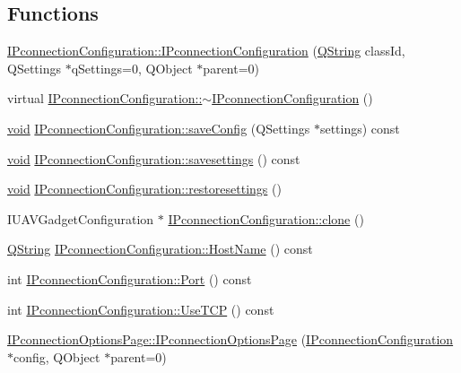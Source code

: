 \subsection*{\-Functions}
\begin{DoxyCompactItemize}
\item 
\hyperlink{group___i_p_conn_plugin_ga0ace87181ef54adf63c246bcfa013840}{\-I\-Pconnection\-Configuration\-::\-I\-Pconnection\-Configuration} (\hyperlink{group___u_a_v_objects_plugin_gab9d252f49c333c94a72f97ce3105a32d}{\-Q\-String} class\-Id, \-Q\-Settings $\ast$q\-Settings=0, \-Q\-Object $\ast$parent=0)
\item 
virtual \hyperlink{group___i_p_conn_plugin_ga9c8548dfb0fd37208686bb5d037dfce4}{\-I\-Pconnection\-Configuration\-::$\sim$\-I\-Pconnection\-Configuration} ()
\item 
\hyperlink{group___u_a_v_objects_plugin_ga444cf2ff3f0ecbe028adce838d373f5c}{void} \hyperlink{group___i_p_conn_plugin_ga65bf62eee71070aef5ce1f9fe1f24322}{\-I\-Pconnection\-Configuration\-::save\-Config} (\-Q\-Settings $\ast$settings) const 
\item 
\hyperlink{group___u_a_v_objects_plugin_ga444cf2ff3f0ecbe028adce838d373f5c}{void} \hyperlink{group___i_p_conn_plugin_ga6e5d554b42d69fd06e4817ec4bece987}{\-I\-Pconnection\-Configuration\-::savesettings} () const 
\item 
\hyperlink{group___u_a_v_objects_plugin_ga444cf2ff3f0ecbe028adce838d373f5c}{void} \hyperlink{group___i_p_conn_plugin_gabd3e5ffc6975c4ef5389faaf21fb55c0}{\-I\-Pconnection\-Configuration\-::restoresettings} ()
\item 
\-I\-U\-A\-V\-Gadget\-Configuration $\ast$ \hyperlink{group___i_p_conn_plugin_gaf970300a500acc18095f6d50a3926529}{\-I\-Pconnection\-Configuration\-::clone} ()
\item 
\hyperlink{group___u_a_v_objects_plugin_gab9d252f49c333c94a72f97ce3105a32d}{\-Q\-String} \hyperlink{group___i_p_conn_plugin_gad855d70f2d3eee8910ee94c261e9f3cb}{\-I\-Pconnection\-Configuration\-::\-Host\-Name} () const 
\item 
int \hyperlink{group___i_p_conn_plugin_gaaa57ca41a00de517e859afa3c339099a}{\-I\-Pconnection\-Configuration\-::\-Port} () const 
\item 
int \hyperlink{group___i_p_conn_plugin_ga584108a558af4b69e0494772eb273f94}{\-I\-Pconnection\-Configuration\-::\-Use\-T\-C\-P} () const 
\item 
\hyperlink{group___i_p_conn_plugin_ga00a24fd6df6f9866d5b8e5eb76cd9c93}{\-I\-Pconnection\-Options\-Page\-::\-I\-Pconnection\-Options\-Page} (\hyperlink{class_i_pconnection_configuration}{\-I\-Pconnection\-Configuration} $\ast$config, \-Q\-Object $\ast$parent=0)

\end{DoxyCompactItemize}

